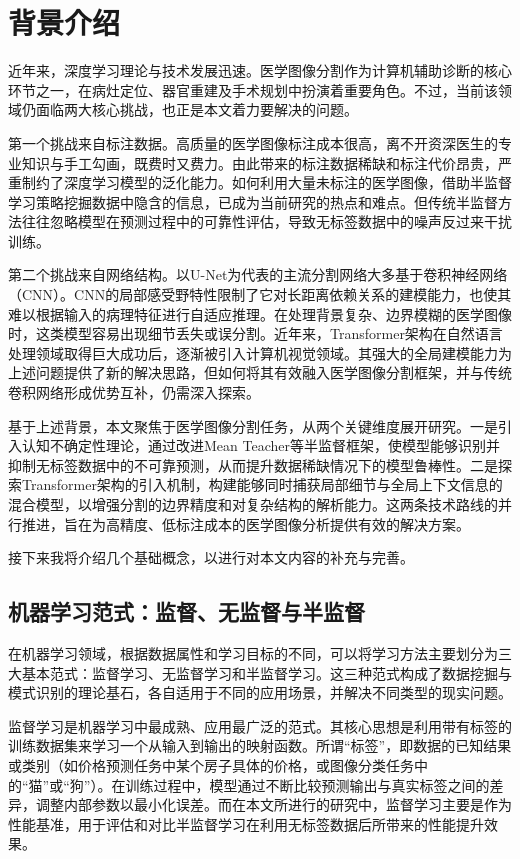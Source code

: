 \documentclass{xduugthesis}
\begin{document}
\section{背景介绍}
近年来，深度学习理论与技术发展迅速。医学图像分割作为计算机辅助诊断的核心环节之一，在病灶定位、器官重建及手术规划中扮演着重要角色。不过，当前该领域仍面临两大核心挑战，也正是本文着力要解决的问题。

第一个挑战来自标注数据。高质量的医学图像标注成本很高，离不开资深医生的专业知识与手工勾画，既费时又费力。由此带来的标注数据稀缺和标注代价昂贵，严重制约了深度学习模型的泛化能力。如何利用大量未标注的医学图像，借助半监督学习策略挖掘数据中隐含的信息，已成为当前研究的热点和难点。但传统半监督方法往往忽略模型在预测过程中的可靠性评估，导致无标签数据中的噪声反过来干扰训练。

第二个挑战来自网络结构。以U-Net为代表的主流分割网络大多基于卷积神经网络（CNN）。CNN的局部感受野特性限制了它对长距离依赖关系的建模能力，也使其难以根据输入的病理特征进行自适应推理。在处理背景复杂、边界模糊的医学图像时，这类模型容易出现细节丢失或误分割。近年来，Transformer架构在自然语言处理领域取得巨大成功后，逐渐被引入计算机视觉领域。其强大的全局建模能力为上述问题提供了新的解决思路，但如何将其有效融入医学图像分割框架，并与传统卷积网络形成优势互补，仍需深入探索。

基于上述背景，本文聚焦于医学图像分割任务，从两个关键维度展开研究。一是引入认知不确定性理论，通过改进Mean Teacher等半监督框架，使模型能够识别并抑制无标签数据中的不可靠预测，从而提升数据稀缺情况下的模型鲁棒性。二是探索Transformer架构的引入机制，构建能够同时捕获局部细节与全局上下文信息的混合模型，以增强分割的边界精度和对复杂结构的解析能力。这两条技术路线的并行推进，旨在为高精度、低标注成本的医学图像分析提供有效的解决方案。

接下来我将介绍几个基础概念，以进行对本文内容的补充与完善。

\subsection{机器学习范式：监督、无监督与半监督}
在机器学习领域，根据数据属性和学习目标的不同，可以将学习方法主要划分为三大基本范式：监督学习、无监督学习和半监督学习。这三种范式构成了数据挖掘与模式识别的理论基石，各自适用于不同的应用场景，并解决不同类型的现实问题。

监督学习是机器学习中最成熟、应用最广泛的范式。其核心思想是利用带有标签的训练数据集来学习一个从输入到输出的映射函数。所谓“标签”，即数据的已知结果或类别（如价格预测任务中某个房子具体的价格，或图像分类任务中的“猫”或“狗”）。在训练过程中，模型通过不断比较预测输出与真实标签之间的差异，调整内部参数以最小化误差。而在本文所进行的研究中，监督学习主要是作为性能基准，用于评估和对比半监督学习在利用无标签数据后所带来的性能提升效果。
\end{document}
